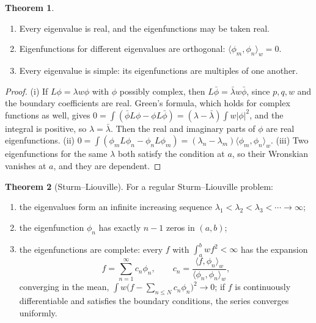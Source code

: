 \documentclass[11pt,a4paper]{article}
\numberwithin{equation}{section}
\theoremstyle{definition}
\newtheorem{thm}{Theorem}[subsection]
\begin{document}
\begin{thm}
\label{thm:slbasic}
\begin{enumerate}[label=(\roman*)]
\item Every eigenvalue is real, and the eigenfunctions may be taken real.
\item Eigenfunctions for different eigenvalues are orthogonal: $\langle\phi_m, \phi_n\rangle_w = 0$.
\item Every eigenvalue is simple: its eigenfunctions are multiples of one another.
\end{enumerate}
\end{thm}

\begin{proof}
(i) If $L\phi = \lambda w\phi$ with $\phi$ possibly complex, then $L\bar\phi = \bar\lambda w\bar\phi$, since $p, q, w$ and the boundary coefficients are real. Green's formula, which holds for complex functions as
well, gives $0 = \int(\bar\phi L\phi - \phi L\bar\phi) = (\lambda - \bar\lambda)\int w|\phi|^2$, and the integral is positive, so $\lambda = \bar\lambda$. Then the real and imaginary parts of $\phi$ are real eigenfunctions. (ii)
$0 = \int(\phi_mL\phi_n - \phi_nL\phi_m) = (\lambda_n - \lambda_m)\langle\phi_m, \phi_n\rangle_w$. (iii) Two eigenfunctions for the same $\lambda$ both satisfy the condition at $a$, so their Wronskian vanishes at $a$, and they are
dependent.
\end{proof}

\begin{thm}[Sturm--Liouville]
\label{thm:slmain}
For a regular Sturm--Liouville problem:
\begin{enumerate}[label=(\roman*)]
\item the eigenvalues form an infinite increasing sequence $\lambda_1 < \lambda_2 < \lambda_3 < \cdots \to \infty$;
\item the eigenfunction $\phi_n$ has exactly $n - 1$ zeros in $(a, b)$;
\item the eigenfunctions are complete: every $f$ with $\int_a^bwf^2 < \infty$ has the expansion
\[
f = \sum_{n=1}^\infty c_n\phi_n, \qquad c_n = \frac{\langle f, \phi_n\rangle_w}{\langle\phi_n, \phi_n\rangle_w} ,
\]
converging in the mean, $\int w\bigl(f - \sum_{n\leq N}c_n\phi_n\bigr)^2 \to 0$; if $f$ is continuously differentiable and satisfies the boundary conditions, the series converges uniformly.
\end{enumerate}
\end{thm}
\end{document}
